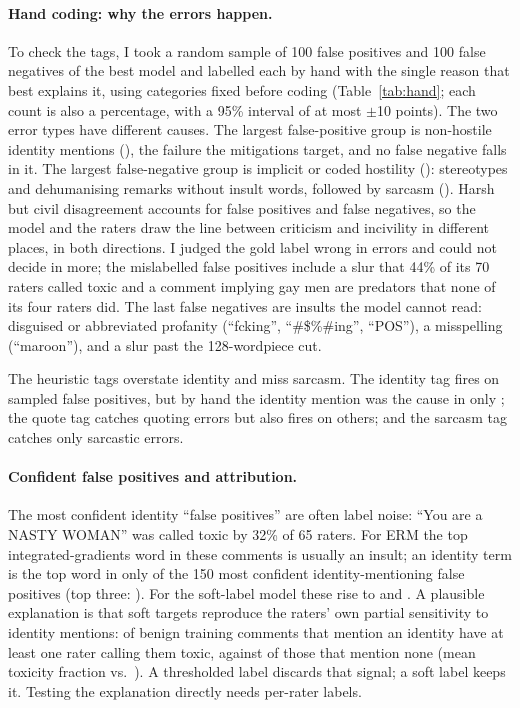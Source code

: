 \paragraph{Hand coding: why the errors happen.} To check the tags, I took a random sample of 100 false positives and
100 false negatives of the best model and labelled each by hand with the single reason that best explains it, using
categories fixed before coding (Table~\ref{tab:hand}; each count is also a percentage, with a 95\% interval of at most
$\pm$10 points). The two error types have different causes. The largest false-positive group is non-hostile identity
mentions (\HandFPIdentity{}), the failure the mitigations target, and no false negative falls in it. The largest
false-negative group is implicit or coded hostility (\HandFNImplicit{}): stereotypes and dehumanising remarks without
insult words, followed by sarcasm (\HandFNSarcasm{}). Harsh but civil disagreement accounts for \HandFPCivil{} false
positives and \HandFNCivil{} false negatives, so the model and the raters draw the line between criticism and
incivility in different places, in both directions. I judged the gold label wrong in \HandGoldWrong{} errors and could
not decide in \HandAmbiguous{} more; the mislabelled false positives include a slur that 44\% of its 70 raters called
toxic and a comment implying gay men are predators that none of its four raters did. The last \HandOther{} false
negatives are insults the model cannot read: disguised or abbreviated profanity (``fcking'', ``\#\$\%\#ing'',
``POS''), a misspelling (``maroon''), and a slur past the 128-wordpiece cut.

The heuristic tags overstate identity and miss sarcasm. The identity tag fires on \HandIdTagFP{} sampled false
positives, but by hand the identity mention was the cause in only \HandFPIdentity{}; the quote tag catches
\HandQuoteTag{} quoting errors but also fires on \HandQuoteTagElse{} others; and the sarcasm tag catches only
\HandSarcTag{} sarcastic errors.

\paragraph{Confident false positives and attribution.} The most confident identity ``false positives'' are often
label noise: ``You are a NASTY WOMAN'' was called toxic by 32\% of 65 raters. For ERM the top integrated-gradients
word in these comments is usually an insult; an identity term is the top word in only \IGTopErm{} of the 150 most
confident identity-mentioning false positives (top three: \IGTopThreeErm{}). For the soft-label model these rise to
\IGTopBest{} and \IGTopThreeBest{}. A plausible explanation is that soft targets reproduce the raters' own partial
sensitivity to identity mentions: \BenignIdRater{} of benign training comments that mention an identity have at least
one rater calling them toxic, against \BenignNoIdRater{} of those that mention none (mean toxicity fraction
\BenignIdFrac{} vs.\ \BenignNoIdFrac{}). A thresholded label discards that signal; a soft label keeps it. Testing the
explanation directly needs per-rater labels.

